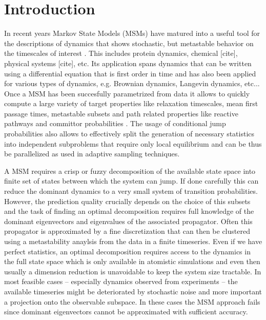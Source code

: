 \documentclass[aps,pre,twocolumn,nofootinbib,superscriptaddress,linenumbers]{revtex4-1}
\begin{document}
\section{Introduction}
\label{section:introduction}

In recent years Markov State Models (MSMs) have matured into a useful
tool for the descriptions of dynamics that shows stochastic, but metastable
behavior on the timescales of interest \cite{Prinz:2011id}. This
includes protein dynamics, chemical {[}cite{]}, physical systems {[}cite{]},
etc. Its application spans dynamics that can be written using a differential
equation that is first order in time and has also been applied for
various types of dynamics, e.g. Brownian dynamics, Langevin dynamics,
etc... Once a MSM has been succesfully parametrized from data it allows
to quickly compute a large variety of target properties like relaxation
timescales, mean first passage times, metastable subsets \cite{Roblitz:2013cg,DeuflhardWeber_PCCA}
and path related properties like reactive pathways and committor probabilities
\cite{VandenEijnden:2006ki,Metzner:2009ub}. The usage of conditional
jump probabilities also allows to effectively split the generation
of necessary statistics into independent subproblems that require
only local equilibrium and can be thus be parallelized as used in
adaptive sampling techniques.

A MSM requires a crisp or fuzzy decomposition of the available state
space into finite set of states between which the system can jump.
If done carefully this can reduce the dominant dynamics to a very
small system of transition probabilities. However, the prediction
quality crucially depends on the choice of this subsets 
\cite{Djurdjevac:MYsgGZyA,Sarich:2010wa}
and the task of finding an optimal decomposition requires full knowledge
of the dominant eigenvectors and eigenvalues of the associated propagator.
Often this propagator is approximated by a fine discretization that
can then be clustered using a metastability anaylsis \cite{Roblitz:2013cg,DeuflhardWeber_PCCA}
from the data in a finite timeseries. Even if we have perfect statistics,
an optimal decomposition requires access to the dynamics in the full
state space which is only available in atomistic simulations and even
then usually a dimension reduction is unavoidable to keep the system
size tractable. In most feasible cases -- especially dynamics observed
from experiments -- the available timeseries might be deteriorated
by stochastic noise and more important a projection onto the observable
subspace. In these cases the MSM approach fails since dominant eigenvectors
cannot be approximated with sufficient accuracy.
\end{document}

